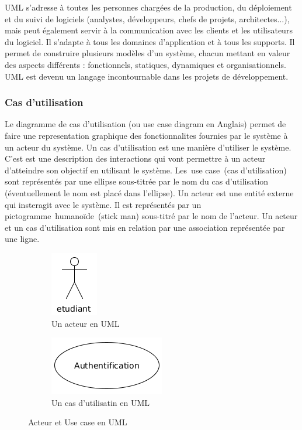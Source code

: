 \documentclass[12pt,a4paper]{article}
\begin{document}
	UML s’adresse à toutes les personnes chargées de la production, du déploiement et du suivi de logiciels (analystes, développeurs, chefs de projets, architectes...), mais peut également servir à la communication avec les clients et les utilisateurs du logiciel. Il s’adapte à tous les domaines d’application et à tous les supports. Il permet de construire plusieurs modèles d’un système, chacun mettant en valeur des aspects différents : fonctionnels, statiques, dynamiques et organisationnels. UML est devenu un langage incontournable dans les projets de développement.
	
	\subsubsection{Cas d'utilisation}
	Le diagramme de cas d'utilisation (ou use case diagram en Anglais) permet de faire une representation graphique des fonctionnalites fournies par le système à un acteur du système. Un cas d’utilisation est une manière d’utiliser le système. C’est est une description des interactions qui vont permettre à un acteur d'atteindre son objectif en utilisant le système. Les use case (cas d'utilisation) sont représentés par une ellipse sous-titrée par le nom du cas d'utilisation (éventuellement le nom est placé dans l'ellipse). Un acteur est une entité externe qui insteragit avec le système. Il est représentés par un pictogramme humanoïde (stick man) sous-titré par le nom de l'acteur.
	Un acteur et un cas d'utilisation sont mis en relation par une association représentée par une ligne.
	\begin{figure}[H]
		\centering
		\begin{subfigure}{.5\textwidth}
			\centering
			\includegraphics[width=.15\linewidth]{./images/actor}
			\caption{Un acteur en UML}
			\label{fig:sub1}
		\end{subfigure}%
		\begin{subfigure}{.5\textwidth}
			\centering
			\includegraphics[width=.4\linewidth]{./images/use_case}
			\caption{Un cas d'utilisatin en UML}
			\label{fig:sub2}
		\end{subfigure}
		\caption{Acteur et Use case en UML}
		\label{fig:figure1}
	\end{figure}
\end{document}
